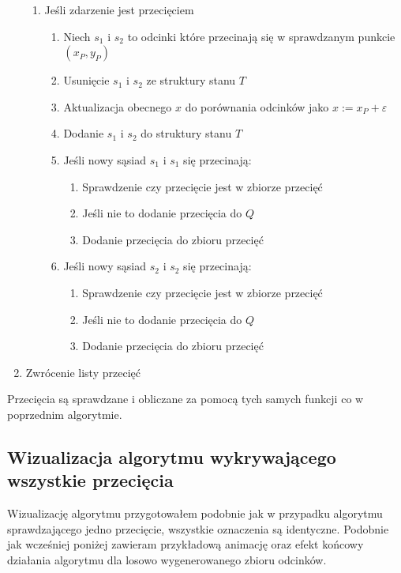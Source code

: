 \documentclass[a4paper]{article}
\begin{document}
\begin{enumerate}
\begin{enumerate}
            \item Jeśli zdarzenie jest przecięciem
                \begin{enumerate}
                    \item Niech $s_1$ i $s_2$ to odcinki które przecinają się w sprawdzanym punkcie $(x_P, y_P)$
                    \item Usunięcie $s_1$ i $s_2$ ze struktury stanu $T$
                    \item Aktualizacja obecnego $x$ do porównania odcinków jako $x := x_P + \varepsilon$
                    \item Dodanie $s_1$ i $s_2$ do struktury stanu $T$
                    \item Jeśli nowy sąsiad $s_1$ i $s_1$ się przecinają:
                    \begin{enumerate}
                        \item Sprawdzenie czy przecięcie jest w zbiorze przecięć
                        \item Jeśli nie to dodanie przecięcia do $Q$
                        \item Dodanie przecięcia do zbioru przecięć
                    \end{enumerate}
                    \item Jeśli nowy sąsiad $s_2$ i $s_2$ się przecinają:
                    \begin{enumerate}
                        \item Sprawdzenie czy przecięcie jest w zbiorze przecięć
                        \item Jeśli nie to dodanie przecięcia do $Q$
                        \item Dodanie przecięcia do zbioru przecięć
                    \end{enumerate}
                \end{enumerate}
        \end{enumerate}
    \item Zwrócenie listy przecięć
\end{enumerate}

Przecięcia są sprawdzane i obliczane za pomocą tych samych funkcji co w poprzednim algorytmie.

\subsection{Wizualizacja algorytmu wykrywającego wszystkie przecięcia}
Wizualizację algorytmu przygotowałem podobnie jak w przypadku algorytmu sprawdzającego jedno przecięcie,
wszystkie oznaczenia są identyczne. Podobnie jak wcześniej poniżej zawieram przykładową animację oraz 
efekt końcowy działania algorytmu dla losowo wygenerowanego zbioru odcinków.
\end{document}
